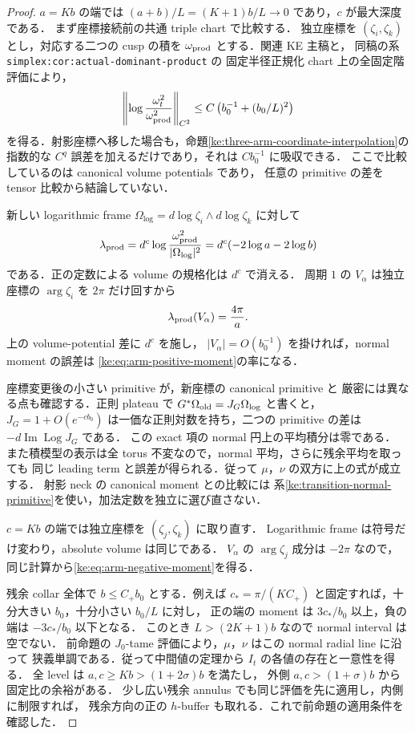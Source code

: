 \begin{proof}
$a=Kb$ の端では $(a+b)/L=(K+1)b/L\to0$ であり，$c$ が最大深度である．
まず座標接続前の共通 triple chart で比較する．
独立座標を $(\zeta_i,\zeta_k)$ とし，対応する二つの cusp の積を
$\omega_{\rm prod}$ とする．関連 KE 主稿\cite[
\texttt{simplex:prop:dominant-product}]{KELocalCurrent}と，
同稿の系 \texttt{simplex:cor:actual-dominant-product} の
固定半径正規化 chart 上の全固定階評価により，
\[
 \left\|\log\frac{\omega_t^2}{\omega_{\rm prod}^2}\right\|_{C^2}
 \le C\left(b_0^{-1}+(b_0/L)^2\right)
\]
を得る．射影座標へ移した場合も，命題\ref{ke:three-arm-coordinate-interpolation}の
指数的な $C^q$ 誤差を加えるだけであり，それは $Cb_0^{-1}$ に吸収できる．
ここで比較しているのは canonical volume potentials であり，
任意の primitive の差を tensor 比較から結論していない．

新しい logarithmic frame $\Omega_{\log}=d\log\zeta_i\wedge d\log\zeta_k$ に対して
\[
 \lambda_{\rm prod}
 =d^c\log\frac{\omega_{\rm prod}^2}{|\Omega_{\log}|^2}
 =d^c(-2\log a-2\log b)
\]
である．正の定数による volume の規格化は $d^c$ で消える．
周期 $1$ の $V_\alpha$ は独立座標の $\arg\zeta_i$ を $2\pi$ だけ回すから
\[
 \lambda_{\rm prod}(V_\alpha)=\frac{4\pi}{a}.
\]
上の volume-potential 差に $d^c$ を施し，
$|V_\alpha|=O(b_0^{-1})$ を掛ければ，normal moment の誤差は
\eqref{ke:eq:arm-positive-moment}の率になる．

座標変更後の小さい primitive が，新座標の canonical primitive と
厳密には異なる点も確認する．正則 plateau で
$G^*\Omega_{\rm old}=J_G\Omega_{\log}$ と書くと，
$J_G=1+O(e^{-c b_0})$ は一価な正則対数を持ち，二つの primitive の差は
$-d\operatorname{Im}\operatorname{Log}J_G$ である．
この exact 項の normal 円上の平均積分は零である．
また積模型の表示は全 torus 不変なので，normal 平均，さらに残余平均を取っても
同じ leading term と誤差が得られる．従って $\mu$，$\nu$ の双方に上の式が成立する．
射影 neck の canonical moment との比較には
系\ref{ke:transition-normal-primitive}を使い，加法定数を独立に選び直さない．

$c=Kb$ の端では独立座標を $(\zeta_j,\zeta_k)$ に取り直す．
Logarithmic frame は符号だけ変わり，absolute volume は同じである．
$V_\alpha$ の $\arg\zeta_j$ 成分は $-2\pi$ なので，
同じ計算から\eqref{ke:eq:arm-negative-moment}を得る．

残余 collar 全体で $b\le C_+b_0$ とする．例えば
$c_*=\pi/(KC_+)$ と固定すれば，十分大きい $b_0$，十分小さい $b_0/L$ に対し，
正の端の moment は $3c_*/b_0$ 以上，負の端は $-3c_*/b_0$ 以下となる．
このとき $L>(2K+1)b$ なので normal interval は空でない．
前命題の $J_0$-tame 評価により，$\mu$，$\nu$ はこの normal radial line に沿って
狭義単調である．従って中間値の定理から $I_t$ の各値の存在と一意性を得る．
全 level は $a,c\ge Kb>(1+2\sigma)b$ を満たし，
外側 $a,c>(1+\sigma)b$ から固定比の余裕がある．
少し広い残余 annulus でも同じ評価を先に適用し，内側に制限すれば，
残余方向の正の $h$-buffer も取れる．これで前命題の適用条件を確認した．
\end{proof}

